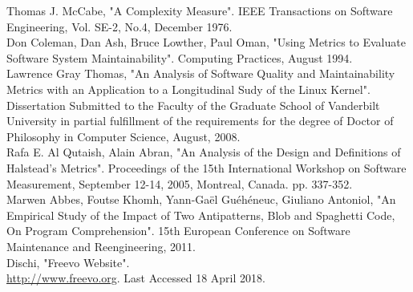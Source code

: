 \documentclass[11pt,journal, a4paper]{IEEEtran}
\begin{document}
\begin{thebibliography}{5}


  
 Thomas J. McCabe, "A Complexity Measure". IEEE Transactions on Software Engineering, Vol. SE-2, No.4, December 1976. \\


 Don Coleman, Dan Ash, Bruce Lowther, Paul Oman, "Using Metrics to Evaluate Software System Maintainability". Computing Practices, August 1994. \\




 Lawrence Gray Thomas, "An Analysis of Software Quality and Maintainability Metrics with an Application to a Longitudinal Sudy of the Linux Kernel". Dissertation Submitted to the Faculty of the Graduate School of Vanderbilt University in partial fulfillment of the requirements for the degree of
Doctor of Philosophy in Computer Science, August, 2008.\\




 Rafa E. Al Qutaish, Alain Abran, "An Analysis of the Design and Definitions of Halstead’s Metrics". Proceedings of the 15th International Workshop on Software Measurement, September 12-14, 2005, Montreal, Canada. pp. 337-352. \\

 Marwen Abbes, Foutse Khomh, Yann-Gaël Guéhéneuc, Giuliano Antoniol, "An Empirical Study of the Impact of Two Antipatterns, Blob and Spaghetti Code, On Program Comprehension". 15th European Conference on Software Maintenance and Reengineering, 2011. \\

 Dischi, "Freevo Website".\\
 \url{http://www.freevo.org}.
Last Accessed 18 April 2018. 


\end{thebibliography}

\onecolumn
\appendix













\end{document}
